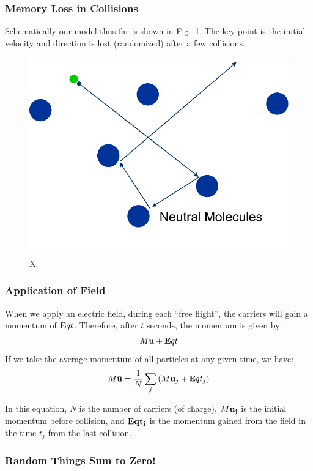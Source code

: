 \subsubsection{Memory Loss in Collisions}
  
Schematically our model thus far is shown in Fig.~\ref{fig:slide8}.   The key point is the initial velocity and direction is lost (randomized) after a few collisions.


\begin{figure}
\begin{center}
\includegraphics[width=.5\columnwidth]{slide8}
\end{center}
\caption{X. } \label{fig:slide8}
\end{figure}
 

\subsubsection{Application of Field}
 
When we apply an electric field, during each “free flight”, the carriers will gain a momentum of $ {\bf{E}}qt $.  Therefore, after $t$ seconds, the momentum is given by:
\begin{equation}
	M{\bf{u}} + {\bf{E}}qt
\end{equation}
 If we take the average momentum of all particles at any given time, we have:
\begin{equation}
	M{\bf{\bar u}} = \frac{1}{N}\sum\limits_j {\left( {M{{\bf{u}}_j} + {\bf{E}}q{t_j}} \right)} 
\end{equation}
 
In this equation, $ N $ is the number of carriers (of charge), $ M \bf{u}_j $ is the initial momentum before collision, and $\bf{E}q{t_j}$ is the momentum gained from the field in the time $t_j$ from the last collision.


\subsubsection{Random Things Sum to Zero!}
 
